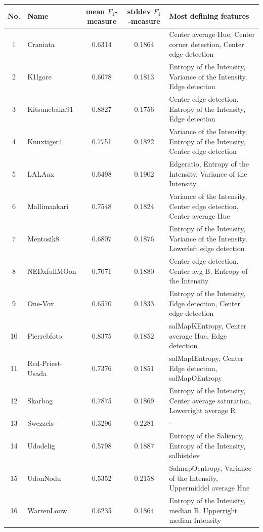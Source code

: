 \begin{table}[htb]
    \centering
    \begin{tabular}
        { | c | l | c | c | l | } 
        \hline
        No. & Name & mean $F_1$-measure & stddev $F_1$-measure & Most defining features\\
        \hline
    1 & Craniata &  0.6314 & 0.1864 & Center average Hue, Center corner detection, Center edge detection\\
    2 & K1lgore & 0.6078 & 0.1813 & Entropy of the Intensity, Variance of the Intensity, Edge detection \\
    3 & Kitsunebaka91 & 0.8827 & 0.1756 & Center edge detection, Entropy of the Intensity, Edge detection \\
    4 & Knuxtiger4 & 0.7751 & 0.1822 & Variance of the Intensity, Entropy of the Intensity, Center edge detection \\
    5 & LALAax & 0.6498 & 0.1902 & Edgeratio, Entropy of the Intensity, Variance of the Intensity \\
    6 & Mallimaakari & 0.7548 & 0.1824 & Variance of the Intensity, Center edge detection, Center average Hue\\
    7 & Mentosik8 & 0.6807 & 0.1876 & Entropy of the Intensity, Variance of the Intensity, Lowerleft edge detection \\ 
    8 & NEDxfullMOon & 0.7071 & 0.1880 & Center edge detection, Center avg B, Entropy of the Intensity\\
    9 & One-Vox & 0.6570 & 0.1833 & Entropy of the Intensity, Edge detection, Center edge detection  \\
    10 & Pierrebfoto & 0.8375 & 0.1852 & salMapKEntropy, Center average Hue, Edge detection\\
    11 & Red-Priest-Usada & 0.7376 & 0.1851 & salMapIEntropy, Center Edge detection, salMapOEntropy\\
    12 & Skarbog & 0.7875 & 0.1869 & Entropy of the Intensity, Center average saturation, Lowerright average R \\
    13 & Swezzels & 0.3296 & 0.2281 & - \\ 
    14 & Udodelig & 0.5798 & 0.1887 & Entropy of the Saliency, Entropy of the Intensity, salhistdev \\
    15 & UdonNodu & 0.5352 & 0.2158 & SalmapOentropy, Variance of the Intensity, Uppermiddel average Hue \\ 
    16 & WarrenLouw & 0.6235 & 0.1864 & Entropy of the Intensity, median B, Upperright median Intensity\\

\end{tabular}
\end{table}
